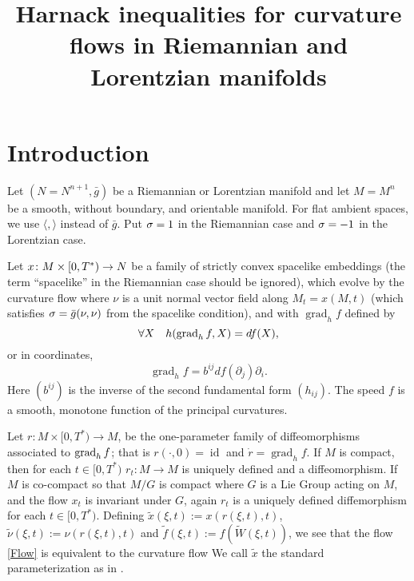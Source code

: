 
\usepackage{mathrsfs}
\DeclareMathOperator{\ad}{ad}



\title[Harnack inequalities for curvature flows]{Harnack inequalities for curvature flows in Riemannian and Lorentzian manifolds}
\maketitle
\section{Introduction}
\label{sec:intro}
Let $(N=N^{n+1},\bar{g})$ be a Riemannian or Lorentzian manifold and let $M=M^{n}$ be a smooth, without boundary, and orientable manifold. For flat ambient spaces, we use $\langle,\rangle$ instead of $\bar{g}.$ Put $\sigma = 1$ in the Riemannian case and $\sigma = -1$ in the Lorentzian case.

Let
$x\colon M\times[0,T^{\ast})\rightarrow N$
be a family of strictly convex spacelike embeddings (the term ``spacelike'' in the Riemannian case should be ignored), which evolve by the curvature flow
where $\nu$ is a unit normal vector field along $M_{t}=x(M,t)$ (which satisfies $\sigma=\bar{g}(\nu,\nu)$ from the spacelike condition), and with $\operatorname{grad}_hf$ defined by
\[
\forall X \quad h(\operatorname{grad}_h f, X) = df (X),
\]
or in coordinates,
\[\operatorname{grad}_hf=b^{ij}df(\partial_j)\partial_i.\]
Here $(b^{ij})$ is the inverse of the second fundamental form $(h_{ij})$. The speed $f$ is a smooth, monotone function of the principal curvatures.

Let \(r:M\times [0,T^{\ast})\to M\), be the one-parameter family of diffeomorphisms associated to $\operatorname{grad}_h f$; that is $r(\cdot,0)=\operatorname{id}$ and $\dot{r}=\operatorname{grad}_hf$. If $M$ is compact, then for each $t \in [0, T^{\ast})$ $r_t : M \to M$ is uniquely defined and a diffeomorphism. If $M$ is co-compact so that $M/G$ is compact where $G$ is a Lie Group acting on $M$, and the flow $x_t$ is invariant under $G$, again $r_t$ is a uniquely defined diffemorphism for each $t \in [0, T^{\ast})$. Defining $\tilde{x} (\xi, t) := x (r(\xi,t), t)$, $\tilde{\nu} (\xi, t) :=\nu (r(\xi,t), t)$ and $\tilde{f}(\xi,t):=f(\tilde{W} (\xi, t))$, we see that the flow \eqref{Flow} is equivalent to the curvature flow
\eq{\label{FlowStandard}
\tilde{x}&:M\times [0,T^{\ast})\to N\\
\dot{\tilde{x}} &= -\s \tilde{f} \tilde{\nu}.}
We call $\tilde{x}$ the standard parameterization as in \cite{Andrews:09/1994}.

